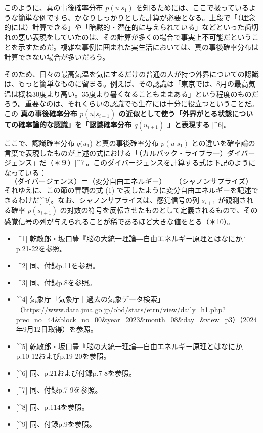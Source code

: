 このように、真の事後確率分布 \(p(u|s_1)\)
を知るためには、ここで扱っているような簡単な例ですら、かなりしっかりとした計算が必要となる。上段で「（理念的には）計算できる」や「暗黙的・潜在的に与えられている」などといった歯切れの悪い表現をしていたのは、その計算が多くの場合で事実上不可能だということを示すためだ。複雑な事例に囲まれた実生活においては、真の事後確率分布は計算できない場合が多いだろう。

そのため、日々の最高気温を気にするだけの普通の人が持つ外界についての認識は、もっと簡単なものに留まる。例えば、その認識は「東京では、8月の最高気温は概ね30度より高い。35度より暑くなることもままある」という程度のものだろう。重要なのは、それくらいの認識でも生存には十分に役立つということだ。この
\textbf{真の事後確率分布 \(p(u|s_{i+1})\)
の近似として使う「外界がとる状態についての確率論的な認識」を「認識確率分布
\(q(u_{i+1})\) 」と表現する} {[}\^{}6{]}。

ここで、認識確率分布 \(q(u_1\)) と真の事後確率分布 \(p(u|s_1)\)
との違いを確率論の言葉で表現したものが上述の式における「（カルバック・ライブラー）ダイバージェンス」だ（＊９）{[}\^{}7{]}。このダイバージェンスを計算する式は下記のようになっている：
\[
（ダイバージェンス）＝（変分自由エネルギー）-（シャノンサプライズ）\tag{2}
\] それゆえに、この節の冒頭の式 (1)
で表したように変分自由エネルギーを記述できるわけだ{[}\^{}9{]}。なお、シャノンサプライズは、感覚信号の列
\(s_{i+1}\) が観測される確率 \(p(s_{i+1})\)
の対数の符号を反転させたものとして定義されるもので、その感覚信号の列が与えられることが稀であるほど大きな値をとる（＊10）。

\begin{itemize}
\tightlist
\item
  {[}\^{}1{]}
  乾敏郎・坂口豊『脳の大統一理論―自由エネルギー原理とはなにか』p.21-22を参照。
\item
  {[}\^{}2{]} 同、付録p.11を参照。
\item
  {[}\^{}3{]} 同、付録p.8を参照。
\item
  {[}\^{}4{]}
  気象庁「気象庁｜過去の気象データ検索」（\url{https://www.data.jma.go.jp/obd/stats/etrn/view/daily_h1.php?prec_no=44&block_no=00&year=2023&month=08&day=&view=p3}）（2024年9月12日取得）を参照。
\item
  {[}\^{}5{]}
  乾敏郎・坂口豊『脳の大統一理論―自由エネルギー原理とはなにか』p.10-12およびp.19-20を参照。
\item
  {[}\^{}6{]} 同、p.21および付録p.7-8を参照。
\item
  {[}\^{}7{]} 同、付録p.7-9を参照。
\item
  {[}\^{}8{]} 同、p.114を参照。
\item
  {[}\^{}9{]} 同、付録p.9を参照。
\end{itemize}

